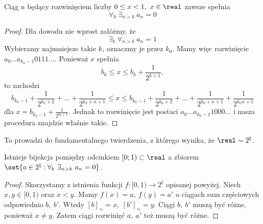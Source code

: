 \begin{theorem}
    Ciąg \( a \) będący rozwinięciem liczby \( 0 \leq x < 1, \ x \in \real \) zawsze spełnia
    \[ \forall_{k} \ \exists_{n > k} \ a_n = 0 \]
\end{theorem}
\begin{proof}
    Dla dowodu nie wprost załóżmy, że 
    \[ \exists_{k} \ \forall_{n > k} \ a_n = 1 \]
    Wybieramy najmniejsze takie \( k \), oznaczmy je przez \( k_0 \). Mamy więc rozwinięcie \( a_0 \dots a_{k_0-1}0111\dots \). Ponieważ \( x \) spełnia
    \[
    b_k \leq x \leq b_k + \frac{1}{2^{k+1}},
    \]
    to zachodzi
    \[
    b_{k_0 - 1} + \frac{1}{2^{k_0 + 2}} + \ldots + \frac{1}{2^{k_0 + n + 1}} \leq x \leq b_{k_0 - 1} + \frac{1}{2^{k_0 + 2}} + \ldots + \frac{1}{2^{k_0 + n + 1}} + \frac{1}{2^{k_0n + 1}}
    \]
    dla \( x = b_{k_0 - 1} + \frac{1}{2^{k_0+1}} \). Jednak to rozwinięcie jest postaci \( a_0 \dots a_{k_0-1}1000\dots \) i nasza procedura znajdzie właśnie takie.
\end{proof}

To prowadzi do fundamentalnego twierdzenia, z którego wynika, że \( \real \sim 2^{\natural} \).
\begin{theorem}
    Istnieje bijekcja pomiędzy odcinkiem \([0; 1) \subset \real \) a zbiorem \linebreak \( \set{a \in 2^{\natural} : \forall_{k} \ \exists_{n > k} \ a_n = 0} \).
\end{theorem}
\begin{proof}
    Skorzystamy z istnienia funkcji \( f : [0, 1) \rightarrow 2^{\natural} \) opisanej powyżej. Niech \( x, y \in [0, 1) \) oraz \( x < y \).
    Mamy \( f(x) = a, \ f(y) = a' \) o ciągach sum częściowych odpowiednio \( b, \ b' \). Wtedy \( [b]_{\simeq} = x, \ [b']_{\simeq} = y \).
    Ciągi \( b, \ b' \) muszą być różne, ponieważ \( x \neq y \). Zatem ciągi rozwinięć \( a, \ a' \) też muszą być różne.
\end{proof}